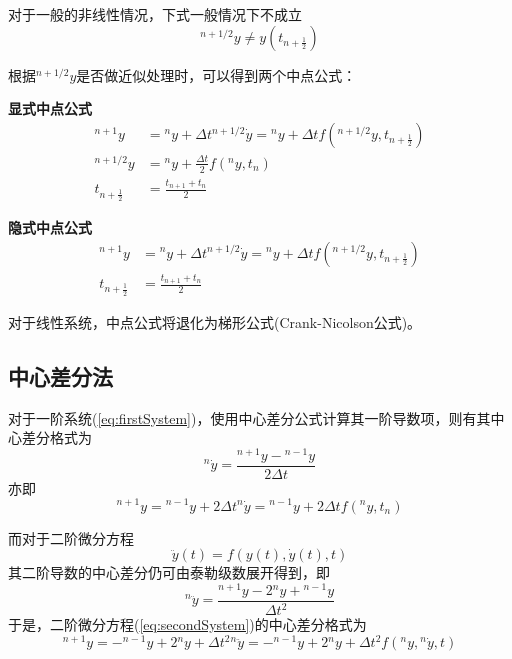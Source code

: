 对于一般的非线性情况，下式一般情况下不成立
\begin{equation}
{^{n+1/2}\!y}\neq y(t_{n+\frac{1}{2}})
\end{equation}

根据${^{n+1/2}\!y}$是否做近似处理时，可以得到两个中点公式：

\textbf{显式中点公式\cite{Gear1971c}}
\begin{align}
{^{n+1}\!y}&={^n\!y}+\Delta t{^{n+1/2}\!\dot{y}}={^n\!y}+\Delta tf({^{n+1/2}\!{y}},t_{n+\frac{1}{2}})\\
{^{n+1/2}\!{y}}&={^n\!y}+\frac{\Delta t}{2}f({^n\!y},t_n)\\
t_{n+\frac12}&=\frac{t_{n+1}+t_n}{2}
\end{align}

\textbf{隐式中点公式\cite{ErnstHairer1993a}}
\begin{align}
{^{n+1}\!y}&={^n\!y}+\Delta t{^{n+1/2}\!\dot{y}}={^n\!y}+\Delta tf({^{n+1/2}\!{y}},t_{n+\frac{1}{2}})\\
t_{n+\frac12}&=\frac{t_{n+1}+t_n}{2}
\end{align}

对于线性系统，中点公式将退化为梯形公式(Crank-Nicolson公式)。

\subsection{中心差分法}
对于一阶系统(\ref{eq:firstSystem})，使用中心差分公式计算其一阶导数项，则有其中心差分格式为
\begin{equation}
{^n\!\dot{y}}=\frac{{^{n+1}\!y}-{^{n-1}\!y}}{2\Delta t}
\end{equation}
亦即
\begin{equation}
{^{n+1}\!y}={^{n-1}\!y}+2\Delta t{^n\!\dot{y}}={^{n-1}\!y}+2\Delta tf({^n\!y},t_n)
\end{equation}

而对于二阶微分方程
\begin{equation}
\ddot{y}(t)=f(y(t),\dot{y}(t),t)\label{eq:secondSystem}
\end{equation}
其二阶导数的中心差分仍可由泰勒级数展开得到，即
\begin{equation}
{^n\!\ddot{y}}=\frac{{^{n+1}\!y}-2{^n\!y}+{^{n-1}\!y}}{\Delta t^2}
\end{equation}
于是，二阶微分方程(\ref{eq:secondSystem})的中心差分格式为
\begin{equation}
{^{n+1}\!y}=-{^{n-1}\!y}+2{^n\!y}+\Delta t^2{^n\!\ddot{y}}=-{^{n-1}\!y}+2{^n\!y}+\Delta t^2f({^n\!y},{^n\!\dot{y}},t)
\end{equation}

